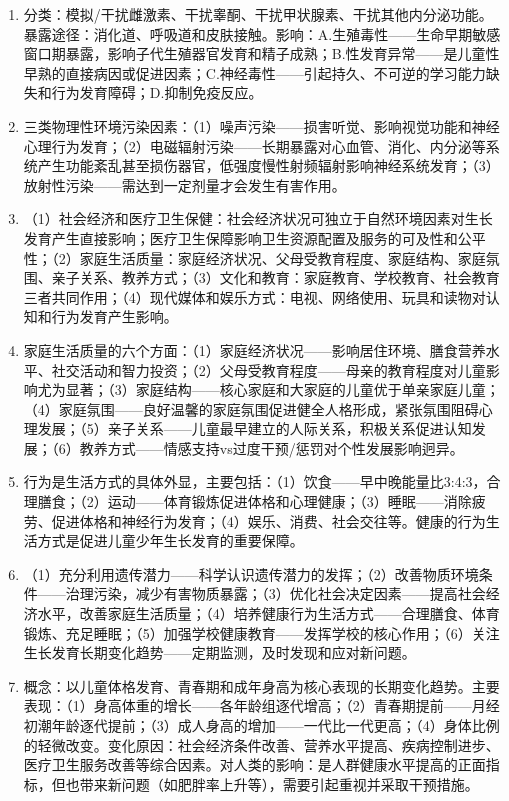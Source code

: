 \begin{enumerate}[leftmargin=*, itemsep=5pt]
    \item 分类：模拟/干扰雌激素、干扰睾酮、干扰甲状腺素、干扰其他内分泌功能。暴露途径：消化道、呼吸道和皮肤接触。影响：A.生殖毒性——生命早期敏感窗口期暴露，影响子代生殖器官发育和精子成熟；B.性发育异常——是儿童性早熟的直接病因或促进因素；C.神经毒性——引起持久、不可逆的学习能力缺失和行为发育障碍；D.抑制免疫反应。

    \item 三类物理性环境污染因素：（1）噪声污染——损害听觉、影响视觉功能和神经心理行为发育；（2）电磁辐射污染——长期暴露对心血管、消化、内分泌等系统产生功能紊乱甚至损伤器官，低强度慢性射频辐射影响神经系统发育；（3）放射性污染——需达到一定剂量才会发生有害作用。

    \item （1）社会经济和医疗卫生保健：社会经济状况可独立于自然环境因素对生长发育产生直接影响；医疗卫生保障影响卫生资源配置及服务的可及性和公平性；（2）家庭生活质量：家庭经济状况、父母受教育程度、家庭结构、家庭氛围、亲子关系、教养方式；（3）文化和教育：家庭教育、学校教育、社会教育三者共同作用；（4）现代媒体和娱乐方式：电视、网络使用、玩具和读物对认知和行为发育产生影响。

    \item 家庭生活质量的六个方面：（1）家庭经济状况——影响居住环境、膳食营养水平、社交活动和智力投资；（2）父母受教育程度——母亲的教育程度对儿童影响尤为显著；（3）家庭结构——核心家庭和大家庭的儿童优于单亲家庭儿童；（4）家庭氛围——良好温馨的家庭氛围促进健全人格形成，紧张氛围阻碍心理发展；（5）亲子关系——儿童最早建立的人际关系，积极关系促进认知发展；（6）教养方式——情感支持vs过度干预/惩罚对个性发展影响迥异。

    \item 行为是生活方式的具体外显，主要包括：（1）饮食——早中晚能量比3:4:3，合理膳食；（2）运动——体育锻炼促进体格和心理健康；（3）睡眠——消除疲劳、促进体格和神经行为发育；（4）娱乐、消费、社会交往等。健康的行为生活方式是促进儿童少年生长发育的重要保障。

    \item （1）充分利用遗传潜力——科学认识遗传潜力的发挥；（2）改善物质环境条件——治理污染，减少有害物质暴露；（3）优化社会决定因素——提高社会经济水平，改善家庭生活质量；（4）培养健康行为生活方式——合理膳食、体育锻炼、充足睡眠；（5）加强学校健康教育——发挥学校的核心作用；（6）关注生长发育长期变化趋势——定期监测，及时发现和应对新问题。

    \item 概念：以儿童体格发育、青春期和成年身高为核心表现的长期变化趋势。主要表现：（1）身高体重的增长——各年龄组逐代增高；（2）青春期提前——月经初潮年龄逐代提前；（3）成人身高的增加——一代比一代更高；（4）身体比例的轻微改变。变化原因：社会经济条件改善、营养水平提高、疾病控制进步、医疗卫生服务改善等综合因素。对人类的影响：是人群健康水平提高的正面指标，但也带来新问题（如肥胖率上升等），需要引起重视并采取干预措施。
\end{enumerate}

\newpage
